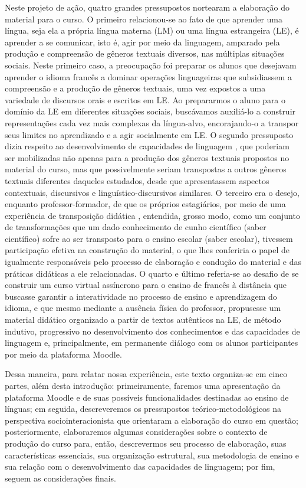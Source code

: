Neste projeto de ação, quatro grandes pressupostos nortearam a
elaboração do material para o curso. O primeiro relacionou-se ao fato de
que aprender uma língua, seja ela a própria língua materna (LM) ou uma
língua estrangeira (LE), é aprender a se comunicar, isto é, agir por
meio da linguagem, amparado pela produção e compreensão de gêneros
textuais diversos, nas múltiplas situações sociais. Neste primeiro caso,
a preocupação foi preparar os alunos que desejavam aprender o idioma
francês a dominar operações linguageiras que subsidiassem a compreensão
e a produção de gêneros textuais, uma vez expostos a uma variedade de
discursos orais e escritos em LE. Ao prepararmos o aluno para o domínio
da LE em diferentes situações sociais, buscávamos auxiliá-lo a construir
representações cada vez mais complexas da língua-alvo, encorajando-o a
transpor seus limites no aprendizado e a agir socialmente em LE. O
segundo pressuposto dizia respeito ao desenvolvimento de capacidades de
linguagem \cite{dolz-mestre_acquisition_1993,schneuwly_generos_2004}, que
poderiam ser mobilizadas não apenas para a produção dos gêneros textuais
propostos no material do curso, mas que possivelmente seriam transpostas
a outros gêneros textuais diferentes daqueles estudados, desde que
apresentassem aspectos contextuais, discursivos e
linguístico-discursivos similares. O terceiro era o desejo, enquanto
professor-formador, de que os próprios estagiários, por meio de uma
experiência de transposição didática \cite{chevallard_transposition_1981}, entendida, grosso modo, como um conjunto de transformações que um dado conhecimento de cunho científico (saber científico) sofre ao ser transposto para o ensino escolar (saber escolar), tivessem participação efetiva na
construção do material, o que lhes conferiria o papel de igualmente
responsáveis pelo processo de elaboração e condução do material e das
práticas didáticas a ele relacionadas. O quarto e último referia-se ao
desafio de se construir um curso virtual assíncrono para o ensino de
francês à distância que buscasse garantir a interatividade no processo
de ensino e aprendizagem do idioma, e que mesmo mediante a ausência
física do professor, propusesse um material didático organizado a partir
de textos autênticos na LE, de método indutivo, progressivo no
desenvolvimento dos conhecimentos e das capacidades de linguagem e,
principalmente, em permanente diálogo com os alunos participantes por
meio da plataforma Moodle.

Dessa maneira, para relatar nossa experiência, este texto organiza-se em
cinco partes, além desta introdução: primeiramente, faremos uma
apresentação da plataforma Moodle e de suas possíveis funcionalidades
destinadas ao ensino de línguas; em seguida, descreveremos os
pressupostos teórico-metodológicos na perspectiva sociointeracionista
que orientaram a elaboração do curso em questão; posteriormente,
elaboraremos algumas considerações sobre o contexto de produção do curso
para, então, descrevermos seu processo de elaboração, suas
características essenciais, sua organização estrutural, sua metodologia
de ensino e sua relação com o desenvolvimento das capacidades de
linguagem; por fim, seguem as considerações finais.